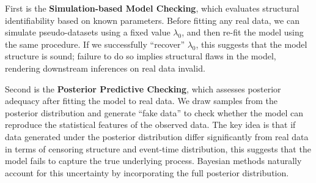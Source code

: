 First is the \textbf{Simulation-based Model Checking}, which evaluates structural identifiability based on known parameters. Before fitting any real data, we can simulate pseudo-datasets using a fixed value $\lambda_0$, and then re-fit the model using the same procedure. If we successfully “recover” $\lambda_0$, this suggests that the model structure is sound; failure to do so implies structural flaws in the model, rendering downstream inferences on real data invalid.

Second is the \textbf{Posterior Predictive Checking}, which assesses posterior adequacy after fitting the model to real data. We draw samples from the posterior distribution and generate “fake data” to check whether the model can reproduce the statistical features of the observed data. The key idea is that if data generated under the posterior distribution differ significantly from real data in terms of censoring structure and event-time distribution, this suggests that the model fails to capture the true underlying process. Bayesian methods naturally account for this uncertainty by incorporating the full posterior distribution.

